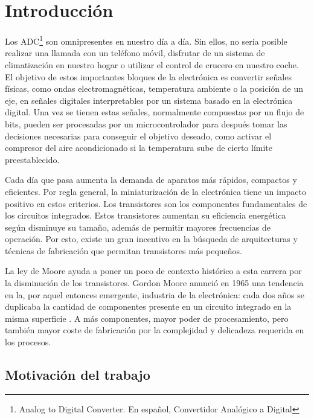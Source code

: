 \documentclass[12pt]{report} %
\begin{document}
\newpage %
\thispagestyle{plain}
\mbox{}

\clearpage
{} %

\chapter{Introducción}

	Los ADC\footnote{Analog to Digital Converter. En español, Convertidor Analógico a Digital} son omnipresentes en nuestro día a día. Sin ellos, no sería posible realizar una llamada con un teléfono móvil, disfrutar de un sistema de climatización en nuestro hogar o utilizar el control de crucero en nuestro coche. El objetivo de estos importantes bloques de la electrónica es convertir señales físicas, como ondas electromagnéticas, temperatura ambiente o la posición de un eje, en señales digitales interpretables por un sistema basado en la electrónica digital. Una vez se tienen estas señales, normalmente compuestas por un flujo de bits, pueden ser procesadas por un microcontrolador para después tomar las decisiones necesarias para conseguir el objetivo deseado, como activar el compresor del aire acondicionado si la temperatura sube de cierto límite preestablecido.
	
	Cada día que pasa aumenta la demanda de aparatos más rápidos, compactos y eficientes. Por regla general, la miniaturización de la electrónica tiene un impacto positivo en estos criterios. Los transistores son los componentes fundamentales de los circuitos integrados. Estos transistores aumentan su eficiencia energética según disminuye su tamaño, además de permitir mayores frecuencias de operación. Por esto, existe un gran incentivo en la búsqueda de arquitecturas y técnicas de fabricación que permitan transistores más pequeños.
	
	La ley de Moore ayuda a poner un poco de contexto histórico a esta carrera por la disminución de los transistores. Gordon Moore anunció en 1965 una tendencia en la, por aquel entonces emergente, industria de la electrónica: cada dos años se duplicaba la cantidad de componentes presente en un circuito integrado en la misma superficie \cite{moorelaw}. A más componentes, mayor poder de procesamiento, pero también mayor coste de fabricación por la complejidad y delicadeza requerida en los procesos.
	
	\section{Motivación del trabajo}
	
\end{document}
